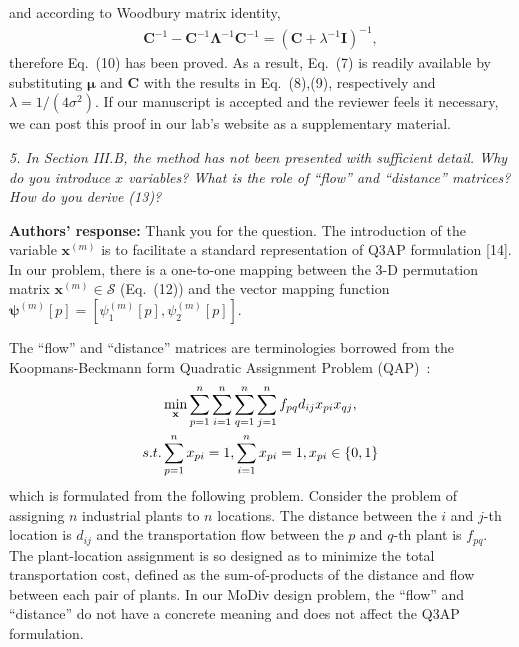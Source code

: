 \documentclass[onecolumn, 11pt, draftclsnofoot]{IEEEtran}
\begin{document}
and according to Woodbury matrix identity,
\begin{align}
  \mathbf{C}^{-1} - \mathbf{C}^{-1} \mathbf{\Lambda}^{-1}
  \mathbf{C}^{-1} = \left(\mathbf{C} + \lambda^{-1}\mathbf{I}\right)^{-1},
\end{align}
therefore Eq.~(10) has been proved. As a result, Eq.~(7) is readily available by
substituting $\bm{\mu}$ and $\mathbf{C}$ with the results in Eq.~(8),(9),
respectively and $\lambda=1/(4\sigma^2)$. If our manuscript is accepted and the
reviewer feels it necessary, we can post this proof in our lab's website as a
supplementary material.
\vspace{0.5cm}

\noindent
\emph{5. In Section III.B, the method has not been presented with sufficient
detail. Why do you introduce $x$ variables? What is the role of ``flow'' and
``distance'' matrices? How do you derive (13)?}

\noindent \textbf{Authors' response:}
Thank you for the question. The introduction of the variable $\mathbf{x}^{(m)}$
is to facilitate a standard representation of Q3AP formulation
[14]\citep[R][]{frieze1974bilinear}\citep[R][]{balas1991algorithm}\citep[R][]{burkard1999linear}\citep[R][]{5587019}.
In our problem, there is a one-to-one mapping between the 3-D permutation matrix
$\mathbf{x}^{(m)}\in\mathcal{S}$ (Eq.~(12)) and the vector mapping function
$\bm{\psi}^{(m)}[p] = [\psi_1^{(m)}[p], \psi_2^{(m)}[p]]$. 

The ``flow'' and ``distance'' matrices are terminologies borrowed from the
Koopmans-Beckmann form Quadratic Assignment Problem
(QAP)~\citep[R][]{koopmans1957assignment}\citep[R][]{806935}:
\begin{align}
  & \min_{\mathbf{x}}
  \sum_{p=1}^{n}\sum_{i=1}^{n}
  \sum_{q=1}^{n}\sum_{j=1}^{n}
  f_{pq}d_{ij}x_{pi}x_{qj},\notag\\
  \mbox{s.t. } & \sum_{p=1}^{n}x_{pi} =
  1,\sum_{i=1}^{n}x_{pi} = 1, x_{pi}\in\{0, 1\}
\end{align}
which is formulated from the following problem. Consider the problem of
assigning $n$ industrial plants to $n$ locations. The distance between the $i$
and $j$-th location is $d_{ij}$ and the transportation flow between the $p$ and
$q$-th plant is $f_{pq}$. The plant-location assignment is so designed as to
minimize the total transportation cost, defined as the sum-of-products of the
distance and flow between each pair of plants. In our MoDiv design problem, the
``flow'' and ``distance'' do not have a concrete meaning and does not affect
the Q3AP formulation.
\end{document}
